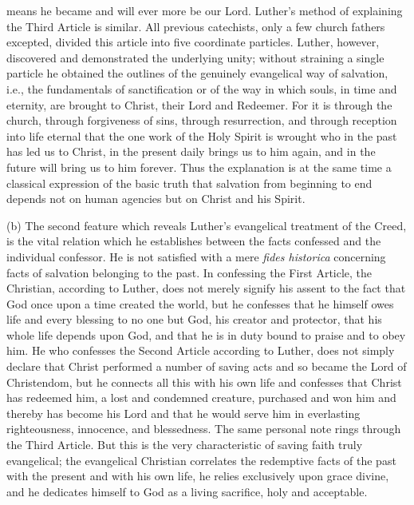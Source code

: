 means he became and will ever more be our Lord. Luther’s method of explaining the Third Article is similar. All previous catechists, only a few church fathers excepted, divided this article into five coordinate particles. Luther, however, discovered and demonstrated the underlying unity; without straining a single particle he obtained the outlines of the genuinely evangelical way of salvation, i.e., the fundamentals of sanctification or of the way in which souls, in time and eternity, are brought to Christ, their Lord and Redeemer. For it is through the church, through forgiveness of sins, through resurrection, and through reception into life eternal that the one work of the Holy Spirit is wrought who in the past has led us to Christ, in the present daily brings us to him again, and in the future will bring us to him forever. Thus the explanation is at the same time a classical expression of the basic truth that salvation from beginning to end depends not on human agencies but on Christ and his Spirit.

(b) The second feature which reveals Luther’s evangelical treatment of the Creed, is the vital relation which he establishes between the facts confessed and the individual confessor. He is not satisfied with a mere \emph{fides historica} concerning facts of salvation belonging to the past. In confessing the First Article, the Christian, according to Luther, does not merely signify his assent to the fact that God once upon a time created the world, but he confesses that he himself owes life and every blessing to no one but God, his creator and protector, that his whole life depends upon God, and that he is in duty bound to praise and to obey him. He who confesses the Second Article according to Luther, does not simply declare that Christ performed a number of saving acts and so became the Lord of Christendom, but he connects all this with his own life and confesses that Christ has redeemed him, a lost and condemned creature, purchased and won him and thereby has become his Lord and that he
would serve him in everlasting righteousness, innocence, and blessedness. The same personal note rings through the Third Article. But this is the very characteristic of saving faith truly evangelical; the evangelical Christian correlates the redemptive facts of the past with the present and with his own life, he relies exclusively upon grace divine, and he dedicates himself to God as a living sacrifice, holy and acceptable.

